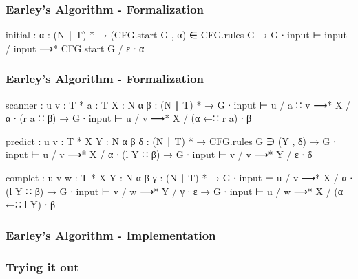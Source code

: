 \begin{frame}
	\frametitle{Earley's Algorithm - Formalization}
	\begin{code}
	  initial : {α : (N ∣ T) *} →
	    (CFG.start G , α) ∈ CFG.rules G →
	    G ∙ input ⊢ input / input ⟶* CFG.start G / ε ∙ α
	\end{code}
\end{frame}

\begin{frame}
	\frametitle{Earley's Algorithm - Formalization}
	\begin{code}
	  scanner : {u v : T *} {a : T} {X : N} {α β : (N ∣ T) *} →
	    G ∙ input ⊢ u / a ∷ v ⟶* X / α ∙ (r a ∷ β) →
	    G ∙ input ⊢ u / v ⟶* X / (α ←∷ r a) ∙ β

	  predict : {u v : T *} {X Y : N} {α β δ : (N ∣ T) *} →
	    CFG.rules G ∋ (Y , δ) →
	    G ∙ input ⊢ u / v ⟶* X / α ∙ (l Y ∷ β) →
	    G ∙ input ⊢ v / v ⟶* Y / ε ∙ δ

	  complet : {u v w : T *} {X Y : N} {α β γ : (N ∣ T) *} →
	    G ∙ input ⊢ u / v ⟶* X / α ∙ (l Y ∷ β) →
	    G ∙ input ⊢ v / w ⟶* Y / γ ∙ ε →
	    G ∙ input ⊢ u / w ⟶* X / (α ←∷ l Y) ∙ β
	\end{code}
\end{frame}

\begin{frame}
	\frametitle{Earley's Algorithm - Implementation}
\end{frame}

\begin{frame}
	\frametitle{Trying it out}
\end{frame}


